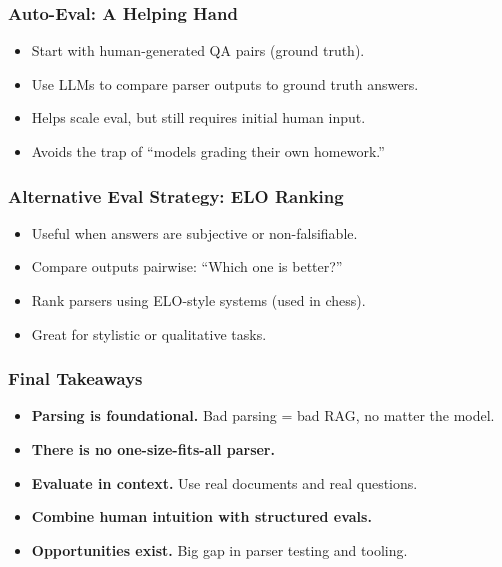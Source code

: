 \begin{frame}[fragile]\frametitle{Auto-Eval: A Helping Hand}
  \begin{itemize}
    \item Start with human-generated QA pairs (ground truth).
    \item Use LLMs to compare parser outputs to ground truth answers.
    \item Helps scale eval, but still requires initial human input.
    \item Avoids the trap of “models grading their own homework.”
  \end{itemize}
\end{frame}

\begin{frame}[fragile]\frametitle{Alternative Eval Strategy: ELO Ranking}
  \begin{itemize}
    \item Useful when answers are subjective or non-falsifiable.
    \item Compare outputs pairwise: “Which one is better?”
    \item Rank parsers using ELO-style systems (used in chess).
    \item Great for stylistic or qualitative tasks.
  \end{itemize}
\end{frame}

\begin{frame}[fragile]\frametitle{Final Takeaways}
  \begin{itemize}
    \item \textbf{Parsing is foundational.} Bad parsing = bad RAG, no matter the model.
    \item \textbf{There is no one-size-fits-all parser.}
    \item \textbf{Evaluate in context.} Use real documents and real questions.
    \item \textbf{Combine human intuition with structured evals.}
    \item \textbf{Opportunities exist.} Big gap in parser testing and tooling.
  \end{itemize}
\end{frame}

